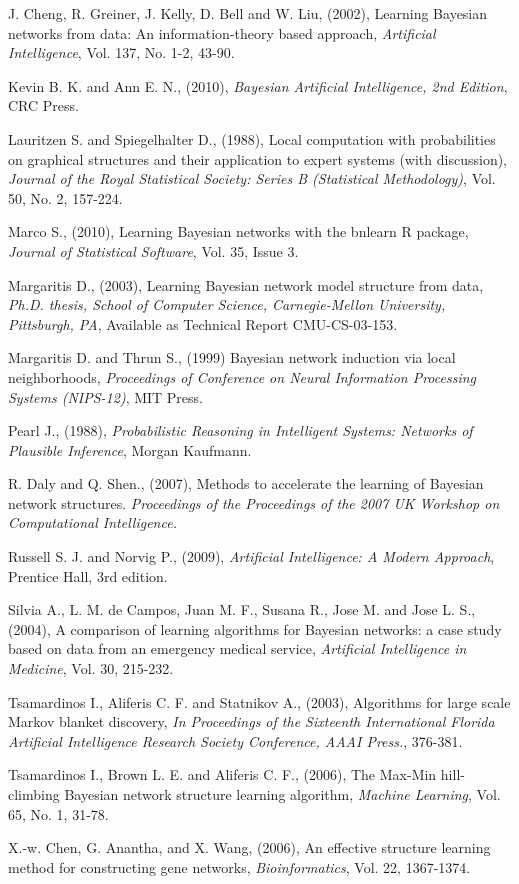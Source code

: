 \begin{bibliography}{99}
\begin{enumerate}
	 J. Cheng, R. Greiner, J. Kelly, D. Bell and W. Liu, (2002), Learning Bayesian networks from data: An information-theory based approach, \emph{Artificial Intelligence}, Vol. 137, No. 1-2, 43-90.
	
	 Kevin B. K. and Ann E. N., (2010), \emph{Bayesian Artificial Intelligence, 2nd Edition}, CRC Press.
		
	 Lauritzen S. and Spiegelhalter D., (1988), Local computation with probabilities on graphical structures and their application to expert systems (with discussion), \emph{Journal of the Royal Statistical Society: Series B (Statistical Methodology)}, Vol. 50, No. 2, 157-224.
	
	 Marco S., (2010), Learning Bayesian networks with the bnlearn R package, \emph{Journal of Statistical Software}, Vol. 35, Issue 3.
	
	 Margaritis D., (2003), Learning Bayesian network model structure from data, \emph{Ph.D. thesis, School of Computer Science, Carnegie-Mellon University, Pittsburgh, PA}, Available as Technical Report CMU-CS-03-153.
	
	 Margaritis D. and Thrun S., (1999) Bayesian network induction via local neighborhoods, \emph{Proceedings of Conference on Neural Information Processing Systems (NIPS-12)}, MIT Press.

	 Pearl J., (1988), \emph{Probabilistic Reasoning in Intelligent Systems: Networks of Plausible Inference}, Morgan Kaufmann.
	
	 R. Daly and Q. Shen., (2007), Methods to accelerate the learning of Bayesian network structures.  \emph{Proceedings of the Proceedings of the 2007 UK Workshop on Computational Intelligence.} 
	
	 Russell S. J. and Norvig P., (2009), \emph{Artificial Intelligence: A Modern Approach}, Prentice Hall, 3rd edition.
	
     Silvia A., L. M. de Campos, Juan M. F., Susana R., Jose M. and Jose L. S., (2004), A comparison of learning algorithms for Bayesian networks: a case study based on data from an emergency medical service, \emph{Artificial Intelligence in Medicine}, Vol. 30, 215-232.
	
	 Tsamardinos I., Aliferis C. F. and Statnikov A., (2003), Algorithms for large scale Markov blanket discovery, \emph{In Proceedings of the Sixteenth International Florida Artificial Intelligence Research Society Conference, AAAI Press.}, 376-381.
	
	 Tsamardinos I., Brown L. E. and Aliferis C. F., (2006), The Max-Min hill-climbing Bayesian network structure learning algorithm, \emph{Machine Learning}, Vol. 65, No. 1, 31-78.
	
     X.-w. Chen, G. Anantha, and X. Wang, (2006), An effective structure learning method for constructing gene networks, \emph{Bioinformatics}, Vol. 22, 1367-1374.
\end{enumerate}
\end{bibliography}
